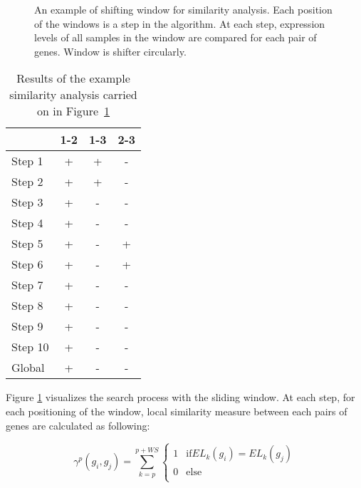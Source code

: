 \begin{figure}
\begin{center}
\end{center}
 \caption{An example of shifting window for similarity analysis. Each position of the
windows is a step in the algorithm. At each step, expression levels of all samples in the window are compared
for each pair of genes. Window is shifter circularly.}\label{figure:window}
\end{figure}
\begin{table}
\begin{center}
 \caption{Results of the example similarity analysis carried on in
Figure~\ref{figure:window}}\label{table:exampleresult}
\begin{tabular}{|l|c|c|c|}
\hline
 & 1-2 & 1-3 & 2-3\\ \hline
Step 1 & + & + & - \\ %
Step 2 & + & + & - \\ %
Step 3 & + & - & - \\ %
Step 4 & + & - & - \\ %
Step 5 & + & - & + \\ %
Step 6 & + & - & + \\ %
Step 7 & + & - & - \\ %
Step 8 & + & - & - \\
Step 9 & + & - & - \\
Step 10 & + & - & - \\ \hline\hline
Global & + & - & - \\ \hline
\end{tabular}
\end{center}
\end{table}

Figure \ref{figure:window} visualizes the search process with the sliding window. At each step, for each 
positioning of the window, local similarity measure between each pairs of genes are calculated as following:

\begin{equation}
\gamma^p(g_i,g_j) = \sum_{k=p}^{p +WS}
\begin{cases}
1 & \text{if} EL_k(g_i) = EL_k(g_j)\\
0 & \text{else}\\
\end{cases}
\end{equation}

